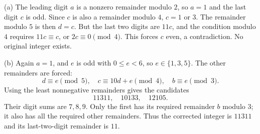 (a) The leading digit $a$ is a nonzero remainder modulo $2$, so $a=1$ and the last digit $c$ is odd. Since $c$ is also a remainder modulo $4$, $c=1$ or $3$. The remainder modulo $5$ is then $d=c$. But the last two digits are $11c$, and the condition modulo $4$ requires $11c\equiv c$, or $2c\equiv0\pmod4$. This forces $c$ even, a contradiction. No original integer exists.

(b) Again $a=1$, and $e$ is odd with $0\le e<6$, so $e\in\{1,3,5\}$. The other remainders are forced:
\[
d\equiv e\pmod5,\quad
c\equiv10d+e\pmod4,\quad
b\equiv e\pmod3.
\]
Using the least nonnegative remainders gives the candidates
\[
11311,\quad10133,\quad12105.
\]
Their digit sums are $7,8,9$. Only the first has its required remainder $b$ modulo $3$; it also has all the required other remainders. Thus the corrected integer is $\boxed{11311}$ and its last-two-digit remainder is $\boxed{11}$.
